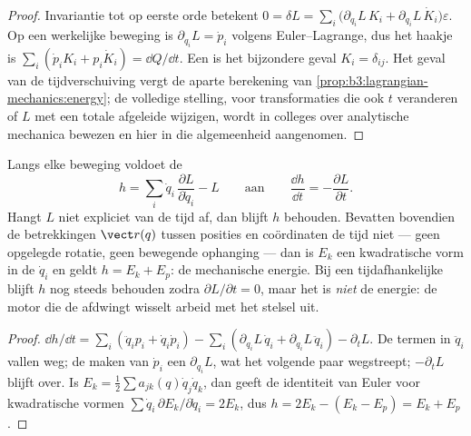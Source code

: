 \begin{proof}
Invariantie tot op eerste orde betekent
$0 = \delta L = \sum_i\big(\partial_{q_i}L\,K_i +
\partial_{\dot q_i}L\,\dot K_i\big)\varepsilon$. Op een werkelijke
beweging is $\partial_{q_i}L = \dot p_i$ volgens Euler--Lagrange, dus het
haakje is $\sum_i(\dot p_iK_i + p_i\dot K_i) = \dd Q/\dd t$. Een  is het bijzondere geval $K_i = \delta_{ij}$. Het geval van de
tijdverschuiving vergt de aparte berekening van
\cref{prop:b3:lagrangian-mechanics:energy}; de volledige stelling, voor
transformaties die ook $t$ veranderen of $L$ met een totale afgeleide
wijzigen, wordt in colleges over analytische mechanica bewezen en hier in
die algemeenheid aangenomen.
\end{proof}

\begin{proposition}[De energiefunctie]\label{prop:b3:lagrangian-mechanics:energy}
Langs elke beweging voldoet de \emph{}
\[
h = \sum_i \dot q_i\,\frac{\partial L}{\partial\dot q_i} - L
\qquad\text{aan}\qquad
\frac{\dd h}{\dd t} = -\frac{\partial L}{\partial t} .
\]
Hangt $L$ niet expliciet van de tijd af, dan blijft $h$ behouden. Bevatten
bovendien de betrekkingen $\vect r(q)$ tussen posities en coördinaten de
tijd niet --- geen opgelegde rotatie, geen bewegende ophanging --- dan is
$E_k$ een kwadratische vorm in de $\dot q_i$ en geldt $h = E_k + E_p$: de
mechanische energie. Bij een tijdafhankelijke  blijft $h$
nog steeds behouden zodra $\partial L/\partial t = 0$, maar het is
\emph{niet} de energie: de motor die de  afdwingt wisselt
arbeid met het stelsel uit.
\end{proposition}

\begin{proof}
$\dd h/\dd t = \sum_i(\ddot q_ip_i + \dot q_i\dot p_i) -
\sum_i(\partial_{q_i}L\,\dot q_i + \partial_{\dot q_i}L\,\ddot q_i) -
\partial_tL$. De termen in $\ddot q_i$ vallen weg; de  maken van $\dot p_i$ een $\partial_{q_i}L$, wat het
volgende paar wegstreept; $-\partial_tL$ blijft over. Is $E_k = \tfrac12\sum a_{jk}(q)\dot
q_j\dot q_k$, dan geeft de identiteit van Euler
voor kwadratische vormen $\sum\dot
q_i\,\partial E_k/\partial\dot q_i = 2E_k$, dus $h = 2E_k - (E_k - E_p)
= E_k + E_p$.
\end{proof}

